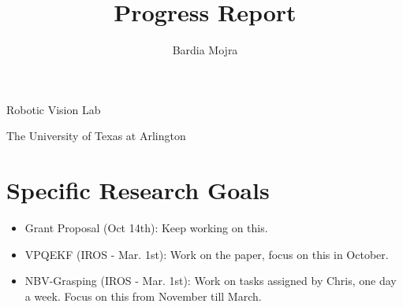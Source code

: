 \documentclass[11pt]{article}
\title{Progress Report}
\author{Bardia Mojra}
\begin{document}
\maketitle
\thispagestyle{empty}

\bigskip
\bigskip
\begin{center}
      Robotic Vision Lab
\end{center}

\begin{center}
      The University of Texas at Arlington
\end{center}

\newpage

\section{Specific Research Goals}
\begin{itemize}
      \item Grant Proposal (Oct 14th): Keep working on this.
      \item VPQEKF (IROS - Mar. 1st): Work on the paper, focus on this in October.
      \item NBV-Grasping (IROS - Mar. 1st): Work on tasks assigned by Chris, one day a week. Focus on this from November till March.
\end{itemize}
\end{document}
